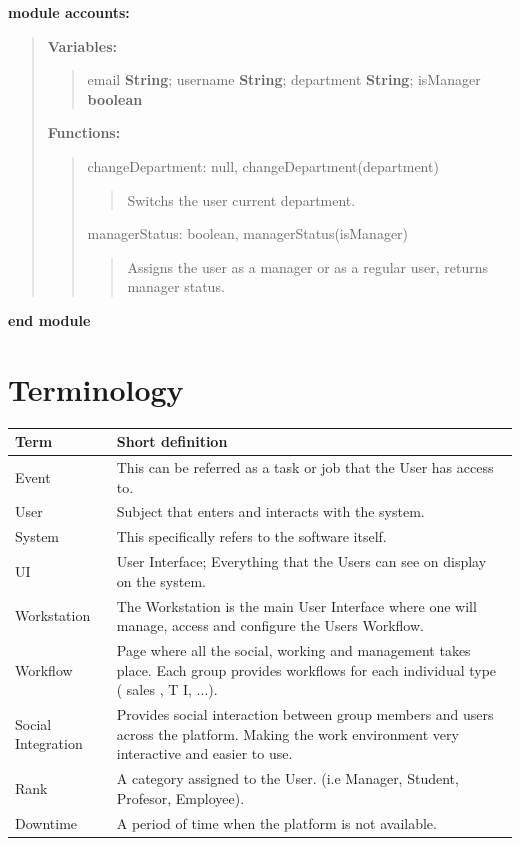 \documentclass{article}
\begin{document}
\noindent \textbf{module accounts:}
\begin{quote}

  \textbf{Variables:}
  \begin{quote}
    email \textbf{String}; username \textbf{String}; department \textbf{String}; isManager \textbf{boolean}
  \end{quote}
  \textbf{Functions:}
  \begin{quote}

    changeDepartment: null, changeDepartment(department)
    \begin{quote}
      Switchs the user current department.
    \end{quote}


    managerStatus: boolean, managerStatus(isManager)
    \begin{quote}
      Assigns the user as a manager or as a regular user, returns manager status.
    \end{quote}

  \end{quote}
\end{quote}
\textbf{end module}

\section{Terminology}
\begin{center}

    \begin{tabular}{| l | p{5cm} |}\hline
    Term & Short definition \\ \hline
    Event & This can be referred as a task or job that the User has access to. \\ \hline
    User & Subject that enters and interacts with the system. \\ \hline
    System & This specifically refers to the software itself. \\ \hline
    UI & User Interface; Everything that the Users can see on display on the system. \\ \hline
    Workstation & The Workstation is the main User Interface where one will manage, access and configure the Users Workflow. \\ \hline
    Workflow & Page where all the social, working and management takes place. Each group provides workflows for each individual type ( sales
    , T I, ...). \\ \hline
    Social Integration & Provides social interaction between group members and users across the platform. Making the work environment very interactive
    and easier to use. \\ \hline
    Rank & A category assigned to the User. (i.e Manager, Student, Profesor, Employee). \\ \hline
    Downtime & A period of time when the platform is not available. \\ \hline
    \end{tabular}

\end{center}
\end{document}
